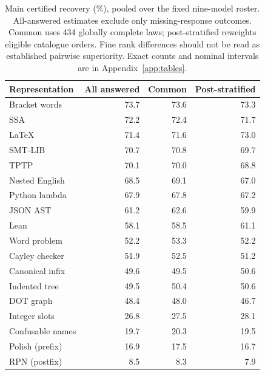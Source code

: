 \documentclass{article}
\newcommand{\pct}{\%}
\begin{document}
\begin{table}[ht]
\centering
\small
\caption{Main certified recovery (\pct), pooled over the fixed nine-model
roster. All-answered estimates exclude only missing-response outcomes. Common
uses 434 globally complete laws; post-stratified reweights eligible catalogue
orders. Fine rank differences should not be read as established pairwise
superiority. Exact counts and nominal intervals are in
Appendix~\ref{app:tables}.}
\label{tab:ranking}
\begin{tabular}{lrrr}
\toprule
Representation & All answered & Common & Post-stratified \\
\midrule
Bracket words & 73.7 & 73.6 & 73.3 \\
SSA & 72.2 & 72.4 & 71.7 \\
LaTeX & 71.4 & 71.6 & 73.0 \\
SMT-LIB & 70.7 & 70.8 & 69.7 \\
TPTP & 70.1 & 70.0 & 68.8 \\
Nested English & 68.5 & 69.1 & 67.0 \\
Python lambda & 67.9 & 67.8 & 67.2 \\
JSON AST & 61.2 & 62.6 & 59.9 \\
Lean & 58.1 & 58.5 & 61.1 \\
Word problem & 52.2 & 53.3 & 52.2 \\
Cayley checker & 51.9 & 52.5 & 51.2 \\
Canonical infix & 49.6 & 49.5 & 50.6 \\
Indented tree & 49.5 & 50.4 & 50.6 \\
DOT graph & 48.4 & 48.0 & 46.7 \\
Integer slots & 26.8 & 27.5 & 28.1 \\
Confusable names & 19.7 & 20.3 & 19.5 \\
Polish (prefix) & 16.9 & 17.5 & 16.7 \\
RPN (postfix) & 8.5 & 8.3 & 7.9 \\
\bottomrule
\end{tabular}
\end{table}
\end{document}
